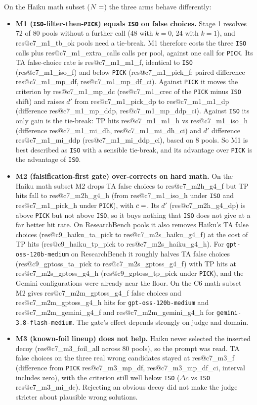 \documentclass[10pt,twocolumn]{article}
\makeatletter
\newcommand{\res}[1]{\csname res@#1\endcsname}
\makeatother
\begin{document}
On the Haiku math subset ($N=\res{c7_m1_n}$) the three arms behave differently:
\begin{itemize}\setlength{\itemsep}{2pt}
\item \textbf{M1 (\texttt{ISO}-filter-then-\texttt{PICK}) equals \texttt{ISO} on false choices.} Stage 1 resolves 72 of 80 pools without a further call (48 with $k=0$, 24 with $k=1$), and \res{c7_m1_tb_ok} pools need a tie-break. M1 therefore costs the three \texttt{ISO} calls plus \res{c7_m1_extra_calls} calls per pool, against one call for \texttt{PICK}. Its TA false-choice rate is \res{c7_m1_m1_f}, identical to \texttt{ISO} (\res{c7_m1_iso_f}) and below \texttt{PICK} (\res{c7_m1_pick_f}; paired difference \res{c7_m1_mp_df}, \res{c7_m1_mp_df_ci}). Against \texttt{PICK} it moves the criterion by \res{c7_m1_mp_dc} (\res{c7_m1_crec} of the \texttt{PICK} minus \texttt{ISO} shift) and raises $d'$ from \res{c7_m1_pick_dp} to \res{c7_m1_m1_dp} (difference \res{c7_m1_mp_ddp}, \res{c7_m1_mp_ddp_ci}). Against \texttt{ISO} its only gain is the tie-break: TP hits \res{c7_m1_m1_h} vs \res{c7_m1_iso_h} (difference \res{c7_m1_mi_dh}, \res{c7_m1_mi_dh_ci}) and $d'$ difference \res{c7_m1_mi_ddp} (\res{c7_m1_mi_ddp_ci}), based on 8 pools. So M1 is best described as \texttt{ISO} with a sensible tie-break, and its advantage over \texttt{PICK} is the advantage of \texttt{ISO}.
\item \textbf{M2 (falsification-first gate) over-corrects on hard math.} On the Haiku math subset M2 drops TA false choices to \res{c7_m2h_g4_f} but TP hits fall to \res{c7_m2h_g4_h} (from \res{c7_m1_iso_h} under \texttt{ISO} and \res{c7_m1_pick_h} under \texttt{PICK}), with $c = \res{c7_m2h_g4_c}$. Its $d'$ (\res{c7_m2h_g4_dp}) is above \texttt{PICK} but not above \texttt{ISO}, so it buys nothing that \texttt{ISO} does not give at a far better hit rate. On ResearchBench pools it also removes Haiku's TA false choices (\res{c9_haiku_ta_pick} to \res{c7_m2s_haiku_g4_f}) at the cost of TP hits (\res{c9_haiku_tp_pick} to \res{c7_m2s_haiku_g4_h}). For \texttt{gpt-oss-120b-medium} on ResearchBench it roughly halves TA false choices (\res{c9_gptoss_ta_pick} to \res{c7_m2s_gptoss_g4_f}) with TP hits at \res{c7_m2s_gptoss_g4_h} (\res{c9_gptoss_tp_pick} under \texttt{PICK}), and the Gemini configurations were already near the floor. On the C6 math subset M2 gives \res{c7_m2m_gptoss_g4_f} false choices and \res{c7_m2m_gptoss_g4_h} hits for \texttt{gpt-oss-120b-medium} and \res{c7_m2m_gemini_g4_f} and \res{c7_m2m_gemini_g4_h} for \texttt{gemini-3.8-flash-medium}. The gate's effect depends strongly on judge and domain.
\item \textbf{M3 (known-foil lineup) does not help.} Haiku never selected the inserted decoy (\res{c7_m3_foil_all} across 80 pools), so the prompt was read. TA false choices on the three real wrong candidates stayed at \res{c7_m3_f} (difference from \texttt{PICK} \res{c7_m3_mp_df}, \res{c7_m3_mp_df_ci}, interval includes zero), with the criterion still well below \texttt{ISO} ($\Delta c$ vs \texttt{ISO} \res{c7_m3_mi_dc}). Rejecting an obvious decoy did not make the judge stricter about plausible wrong solutions.
\end{itemize}
\end{document}
